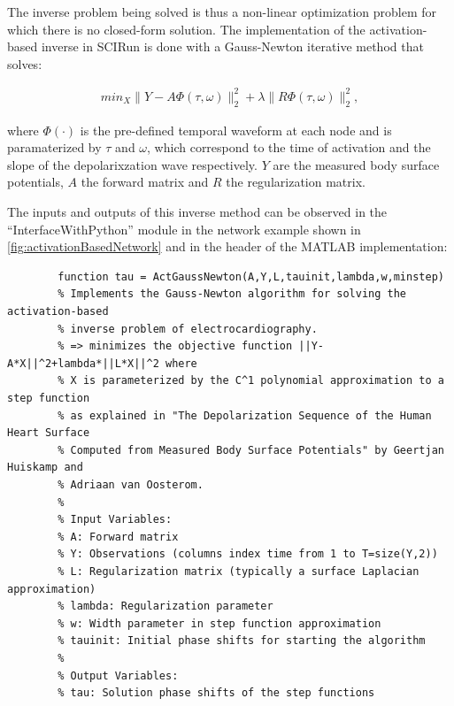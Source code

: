     The inverse problem being solved is thus a non-linear optimization problem for which there is no closed-form solution. 
    The implementation of the activation-based inverse in SCIRun is done with a Gauss-Newton iterative method that solves:
    \begin{center}
        \begin{eqnarray}
            min_{X} \|Y - A \Phi(\tau, \omega) \|^{2}_{2} + \lambda \| R\Phi(\tau, \omega) \|^{2}_{2},
        \label{eq:inverseSec_actBasedObj}
        \end{eqnarray}
    \end{center}
    where $\Phi(\cdot)$ is the pre-defined temporal waveform at each node and is paramaterized by $\tau$ and $\omega$, which correspond to the time of activation and the slope of the depolarixzation wave respectively.
    $Y$ are the measured body surface potentials, $A$ the forward matrix and $R$ the regularization matrix.
    
    The inputs and outputs of this inverse method can be observed in the ``InterfaceWithPython'' module in the network example shown in \autoref{fig:activationBasedNetwork} and in the header of the MATLAB implementation:
    \begin{verbatim}
        function tau = ActGaussNewton(A,Y,L,tauinit,lambda,w,minstep)
        % Implements the Gauss-Newton algorithm for solving the activation-based
        % inverse problem of electrocardiography.
        % => minimizes the objective function ||Y-A*X||^2+lambda*||L*X||^2 where
        % X is parameterized by the C^1 polynomial approximation to a step function
        % as explained in "The Depolarization Sequence of the Human Heart Surface
        % Computed from Measured Body Surface Potentials" by Geertjan Huiskamp and
        % Adriaan van Oosterom.
        %
        % Input Variables:
        % A: Forward matrix
        % Y: Observations (columns index time from 1 to T=size(Y,2))
        % L: Regularization matrix (typically a surface Laplacian approximation)
        % lambda: Regularization parameter
        % w: Width parameter in step function approximation
        % tauinit: Initial phase shifts for starting the algorithm
        %
        % Output Variables:
        % tau: Solution phase shifts of the step functions
    \end{verbatim}
    
